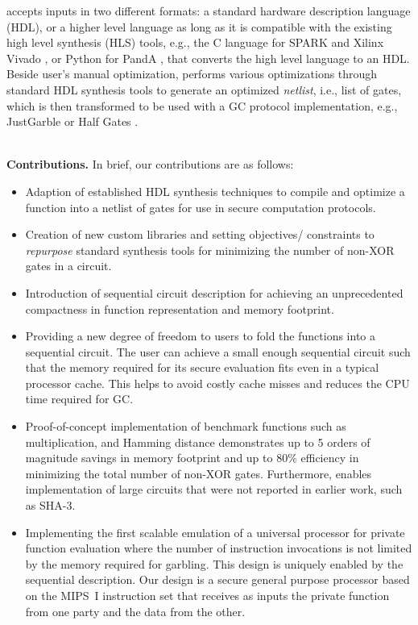 \sys{} accepts inputs in two different formats: a standard hardware description language (HDL), or a higher level language as long as it is compatible with the existing high level synthesis (HLS) tools, e.g., the C language for  SPARK \cite{Gupta2004} and Xilinx Vivado \cite{tool:Vivado}, or Python for PandA \cite{tool:PandA}, that converts the high level language to an HDL.
Beside user's manual optimization, \sys{} performs various optimizations through standard HDL synthesis tools to generate an optimized \emph{netlist}, i.e., list of gates, which is then transformed to be used with a GC protocol implementation, e.g., JustGarble \cite{bellare2013efficient} or Half Gates \cite{zahur2014two}.

\noindent \\
\textbf{Contributions.} In brief, our contributions are as follows:
\begin{itemize}
\item
  Adaption of established HDL synthesis techniques to compile and optimize a function into a netlist of gates for use in secure computation protocols.

\item
  Creation of new custom libraries and setting objectives/ constraints to \emph{repurpose} standard synthesis tools for minimizing the number of non-XOR gates in a circuit.

\item
  Introduction of sequential circuit description for achieving an unprecedented compactness in function representation and memory footprint.

\item
  Providing a new degree of freedom to users to fold the functions into a sequential circuit.
  The user can achieve a small enough sequential circuit such that the memory required for its secure evaluation fits even in a typical processor cache.
  This helps to avoid costly cache misses and reduces the CPU time required for GC.

\item
  Proof-of-concept implementation of benchmark functions such as multiplication, and Hamming distance demonstrates up to 5 orders of magnitude savings in memory footprint and up to $80\%$ efficiency in minimizing the total number of non-XOR gates.
  Furthermore, \sys{} enables implementation of large circuits that were not reported in earlier work, such as SHA-3.%

\item
  Implementing the first scalable emulation of a universal processor for private function evaluation where the number of instruction invocations is not limited by the memory required for garbling.
  This design is uniquely enabled by the \sys{} sequential description.
  Our design is a secure general purpose processor based on the MIPS~I instruction set that receives as inputs the private function from one party and the data from the other.

\end{itemize}

